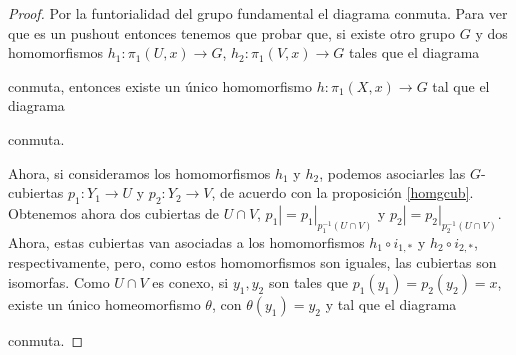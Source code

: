 \documentclass[12pt,a4paper]{book}
\theoremstyle{definition} \newtheorem{defn}[thm]{Definición}
\theoremstyle{definition} \newtheorem{ejemplo}[thm]{Ejemplo}
\theoremstyle{definition} \newtheorem{ejercicio}[thm]{Ejercicio}
\theoremstyle{remark} \newtheorem*{obs}{Observación}
\def\gf{\pi_1}
\begin{document}
\begin{proof}
  Por la funtorialidad del grupo fundamental el diagrama conmuta. Para ver que es un pushout entonces tenemos que probar que, si existe otro grupo $G$ y dos homomorfismos $h_1:\gf(U,x)\rightarrow G$, $h_2:\gf(V,x)\rightarrow G$ tales que el diagrama
 \begin{center}
 \end{center}
 conmuta, entonces existe un único homomorfismo $h:\gf(X,x)\rightarrow G$ tal que el diagrama
 \begin{center}
 \end{center}
 conmuta.

 Ahora, si consideramos los homomorfismos $h_1$ y $h_2$, podemos asociarles las $G$-cubiertas $p_1:Y_1\rightarrow U$ y $p_2:Y_2\rightarrow V$, de acuerdo con la proposición \ref{homgcub}. Obtenemos ahora dos cubiertas de $U\cap V$, $p_1|=p_1|_{p_1^{-1}(U\cap V)}$ y $p_2|=p_2|_{p_2^{-1}(U\cap V)}$. Ahora, estas cubiertas van asociadas a los homomorfismos $h_1\circ i_{1,*}$ y $h_2\circ i_{2,*}$, respectivamente, pero, como estos homomorfismos son iguales, las cubiertas son isomorfas. Como $U\cap V$ es conexo, si $y_1, y_2$ son tales que $p_1(y_1)=p_2(y_2)=x$, existe un único homeomorfismo $\theta$, con $\theta(y_1)=y_2$ y tal que el diagrama
 \begin{center}
 \end{center}
 conmuta.


\end{proof}
\end{document}
